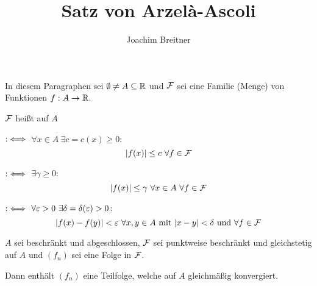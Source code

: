\documentclass{article}
\title{Satz von Arzelà-Ascoli}
\author{Joachim Breitner}
\begin{document}
\maketitle

In diesem Paragraphen sei $\emptyset \ne A \subseteq \mathbb{R}$ und $\mathcal{F}$ sei eine Familie (Menge) von Funktionen $f:A\to\mathbb{R}$.

\begin{definition}
$\mathcal{F}$ heißt auf $A$ 
\begin{liste}
\item {} $:\iff$ $\forall x\in A \ \exists c = c(x) \ge 0:$
\[|f(x)| \le c \ \forall f\in \mathcal{F} \]
\item {} $:\iff$ $\exists \gamma \ge 0: $
\[ |f(x)| \le \gamma  \ \forall x \in A \ \forall f\in \F \]
\item {} $:\iff$ $\forall \varepsilon > 0 \ \exists \delta = \delta(\varepsilon) > 0$:
\[ |f(x) - f(y)|<\ep \ \forall x,y \in A \text{ mit } |x-y| < \delta \text{ und } \forall f\in \F \]
\end{liste}
\end{definition}

\begin{satz*}
$A$ sei beschränkt und abgeschlossen, $\mathcal{F}$ sei punktweise beschränkt und gleichstetig auf $A$ und $(f_n)$ sei eine Folge in $\mathcal{F}$.

Dann enthält $(f_n)$ eine Teilfolge, welche auf $A$ gleichmäßig konvergiert.
\end{satz*}
\end{document}
